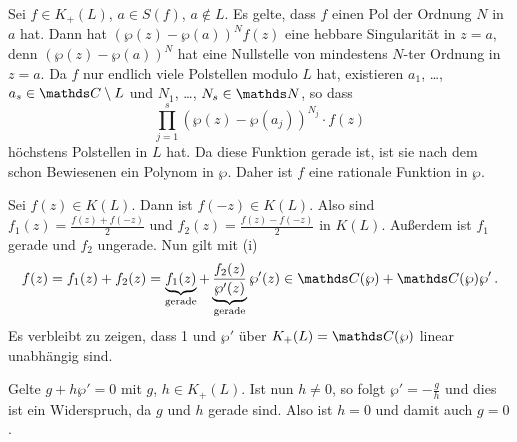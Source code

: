 \begin{bewe-list}
Sei $f\in K_+(L)$, $a\in S(f)$, $a \not\in L$.
Es gelte, dass $f$ einen Pol der Ordnung $N$ in $a$ hat.
Dann hat $(\wp(z) - \wp(a))^N f(z)$ eine hebbare Singularität in $z=a$, denn $(\wp(z) - \wp(a))^N$ hat eine Nullstelle von mindestens $N$-ter Ordnung in $z=a$.
Da $f$ nur endlich viele Polstellen modulo $L$ hat, existieren $a_1$, \ldots, $a_s\in \CC\setminus L$ und $N_1$, \ldots, $N_s\in\NN$, so dass
\[
	\prod_{j=1}^s (\wp(z) - \wp(a_j) )^{N_j} \cdot f(z)
\]
höchstens Polstellen in $L$ hat.
Da diese Funktion gerade ist, ist sie nach dem schon Bewiesenen ein Polynom in $\wp$.
Daher ist $f$ eine rationale Funktion in $\wp$.



\item Sei $f(z) \in K(L)$.
Dann ist $f(-z)\in K(L)$.
Also sind $f_1(z) = \frac{f(z) + f(-z)}{2}$ und $f_2(z) = \frac{f(z) - f(-z)}{2}$ in $K(L)$.
Außerdem ist $f_1$ gerade und $f_2$ ungerade.
Nun gilt mit (i)
\[
	f(z)
	= f_1(z) + f_2(z)
	= \underbrace{f_1(z)}_{\text{gerade}} + \underbrace{\frac{f_2(z)}{\wp'(z)}}_{\text{gerade}} \wp'(z)
	\in \CC(\wp) + \CC(\wp)\wp'
	\,.
\]
Es verbleibt zu zeigen, dass 1 und $\wp'$ über $K_+(L) = \CC(\wp)$ linear unabhängig sind.

Gelte $g+h\wp ' = 0$ mit $g$, $h\in K_+(L)$.
Ist nun $h\neq 0$, so folgt $\wp' = -\frac{g}{h}$ und dies ist ein Widerspruch, da $g$ und $h$ gerade sind.
Also ist $h=0$ und damit auch $g=0$.
\end{bewe-list}